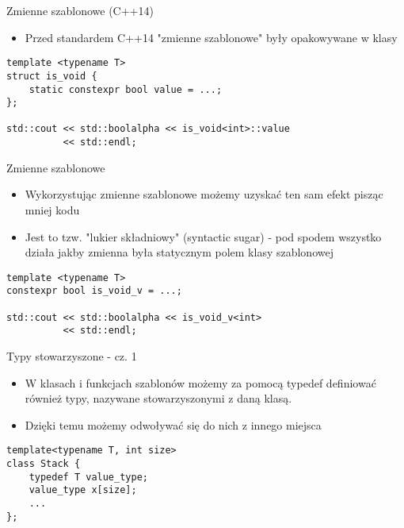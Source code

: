 \documentclass[11pt]{beamer}
\begin{document}
\begin{frame}[fragile]{Zmienne szablonowe (C++14)}
    \begin{itemize}
        \item Przed standardem C++14 "zmienne szablonowe" były opakowywane w klasy
    \end{itemize}
    \begin{lstlisting}[frame=single]
template <typename T>
struct is_void {
    static constexpr bool value = ...;
};

std::cout << std::boolalpha << is_void<int>::value
          << std::endl;
    \end{lstlisting}
\end{frame}

\begin{frame}[fragile]{Zmienne szablonowe}
    \begin{itemize}
        \item Wykorzystując zmienne szablonowe możemy uzyskać ten sam efekt pisząc mniej kodu
        \item Jest to tzw. "lukier składniowy" (syntactic sugar) - pod spodem wszystko działa jakby zmienna była statycznym polem klasy szablonowej
    \end{itemize}
    \begin{lstlisting}[frame=single]
template <typename T>
constexpr bool is_void_v = ...;

std::cout << std::boolalpha << is_void_v<int>
          << std::endl;
    \end{lstlisting}
\end{frame}

\begin{frame}[fragile]{Typy stowarzyszone - cz. 1}
    \begin{itemize}
        \item W klasach i funkcjach szablonów możemy za pomocą typedef definiować również typy, nazywane stowarzyszonymi z daną klasą.
        \item Dzięki temu możemy odwoływać się do nich z innego miejsca
    \end{itemize}
    \begin{lstlisting}[frame=single]
template<typename T, int size>
class Stack {
    typedef T value_type;
    value_type x[size];
    ...
};
    \end{lstlisting}
\end{frame}
\end{document}
